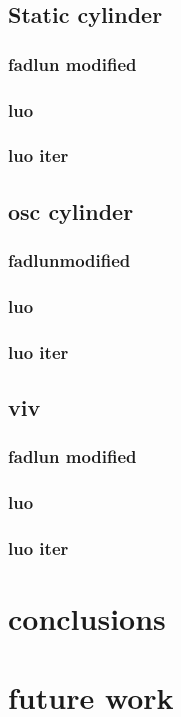 \documentclass[onehalf,11pt]{beavtex}
\begin{document}
\section{Static cylinder}
\subsection{fadlun modified}
\subsection{luo}
\subsection{luo iter}
\section{osc cylinder}
\subsection{fadlunmodified}
\subsection{luo}
\subsection{luo iter}
\section{viv}
\subsection{fadlun modified}
\subsection{luo}
\subsection{luo iter}
\chapter{conclusions}
\chapter{future work}


\end{document}

